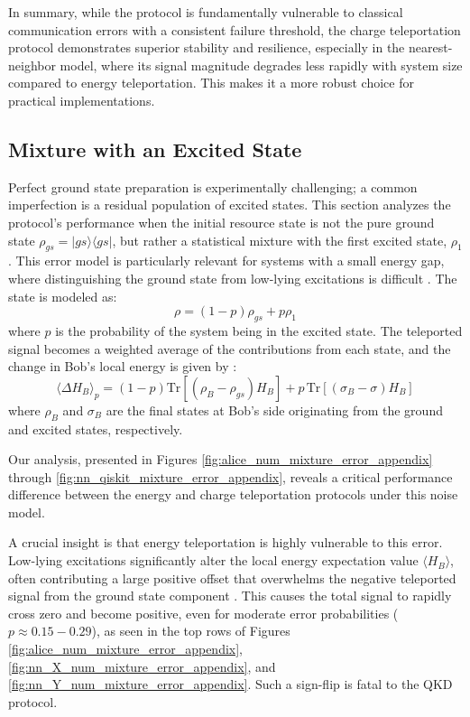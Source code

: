 In summary, while the protocol is fundamentally vulnerable to classical communication errors with a consistent failure threshold, the charge teleportation protocol demonstrates superior stability and resilience, especially in the nearest-neighbor model, where its signal magnitude degrades less rapidly with system size compared to energy teleportation. This makes it a more robust choice for practical implementations.

\subsection{Mixture with an Excited State}



Perfect ground state preparation is experimentally challenging; a common imperfection is a residual population of excited states. This section analyzes the protocol's performance when the initial resource state is not the pure ground state $\rho_{gs} = |gs\rangle\langle gs|$, but rather a statistical mixture with the first excited state, $\rho_1$. This error model is particularly relevant for systems with a small energy gap, where distinguishing the ground state from low-lying excitations is difficult \cite{QKDbyQET}. The state is modeled as:
\begin{equation*}
\rho = (1-p)\rho_{gs} + p\rho_1
\end{equation*}
where $p$ is the probability of the system being in the excited state. The teleported signal becomes a weighted average of the contributions from each state, and the change in Bob's local energy is given by \cite{QKDbyQET}:
\begin{equation*}
\langle\Delta H_B\rangle_p = (1-p)\text{Tr}[(\rho_B - \rho_{gs})H_B] + p\,\text{Tr}[(\sigma_B - \sigma)H_B]
\end{equation*}
where $\rho_B$ and $\sigma_B$ are the final states at Bob's side originating from the ground and excited states, respectively.

Our analysis, presented in Figures \ref{fig:alice_num_mixture_error_appendix} through \ref{fig:nn_qiskit_mixture_error_appendix}, reveals a critical performance difference between the energy and charge teleportation protocols under this noise model.

A crucial insight is that energy teleportation is highly vulnerable to this error. Low-lying excitations significantly alter the local energy expectation value $\langle H_B \rangle$, often contributing a large positive offset that overwhelms the negative teleported signal from the ground state component \cite{QKDbyQET}. This causes the total signal to rapidly cross zero and become positive, even for moderate error probabilities ($p \approx 0.15-0.29$), as seen in the top rows of Figures \ref{fig:alice_num_mixture_error_appendix}, \ref{fig:nn_X_num_mixture_error_appendix}, and \ref{fig:nn_Y_num_mixture_error_appendix}. Such a sign-flip is fatal to the QKD protocol.

